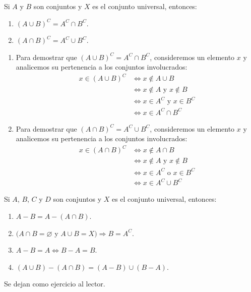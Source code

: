 \begin{theorem}{}{}
    Si $A$ y $B$ son conjuntos y $X$ es el conjunto universal, entonces:
    \begin{enumerate}[label=\roman*., topsep=6pt, itemsep=0pt]
        \item $(A \cup B)^C = A^C \cap B^C$.
        \item $(A \cap B)^C = A^C \cup B^C$.
    \end{enumerate}
    \tcblower
    \demostracion
    \begin{enumerate}[label=\roman*., topsep=6pt, itemsep=0pt]
        \item Para demostrar que $(A \cup B)^C = A^C \cap B^C$, consideremos un elemento $x$ y analicemos su pertenencia a los conjuntos involucrados:
        \begin{align*}
            x \in(A \cup B)^C & \Longleftrightarrow x \notin A \cup B \\ 
            & \Longleftrightarrow x \notin A \text{ y } x \notin B \\ 
            & \Longleftrightarrow  x \in A^C \text { y } x \in B^C \\ 
            & \Longleftrightarrow x \in A^C \cap B^C
        \end{align*}
        \item Para demostrar que $(A \cap B)^C = A^C \cup B^C$, consideremos un elemento $x$ y analicemos su pertenencia a los conjuntos involucrados:
        \begin{align*}
            x \in(A \cap B)^C & \Longleftrightarrow x \notin A \cap B \\ 
            & \Longleftrightarrow x \notin A \text{ y } x \notin B \\ 
            & \Longleftrightarrow  x \in A^C \text { o } x \in B^C \\ 
            & \Longleftrightarrow x \in A^C \cup B^C
        \end{align*}
    \end{enumerate}
\end{theorem}

\begin{prop}{}{}
    Si $A$, $B$, $C$ y $D$ son conjuntos y $X$ es el conjunto universal, entonces:
    \begin{enumerate}[label=\roman*., topsep=6pt, itemsep=0pt]
        \item $A - B = A - (A \cap B)$.
        \item $(A \cap B = \varnothing$ y $A \cup B = X) \Longrightarrow B = A^C$.
        \item $A - B = A \Longleftrightarrow B - A = B$.
        \item $(A \cup B) - (A \cap B) = (A - B) \cup(B - A)$.
    \end{enumerate}
    \tcblower
    \demostracion Se dejan como ejercicio al lector.
\end{prop}

